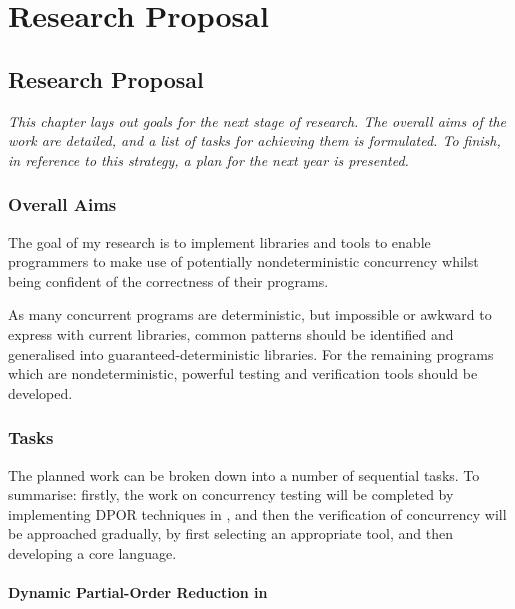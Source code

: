\part{Research Proposal}


\chapter{Research Proposal}
\label{chp:proposal}

\textit{This chapter lays out goals for the next stage of
  research. The overall aims of the work are detailed, and a list of
  tasks for achieving them is formulated. To finish, in reference to
  this strategy, a plan for the next year is presented.}

\section{Overall Aims}
\label{sec:proposal-goals}

The goal of my research is to implement libraries and tools to enable
programmers to make use of potentially nondeterministic concurrency
whilst being confident of the correctness of their programs.

As many concurrent programs are deterministic, but impossible or
awkward to express with current libraries, common patterns should be
identified and generalised into guaranteed-deterministic
libraries. For the remaining programs which are nondeterministic,
powerful testing and verification tools should be developed.

\section{Tasks}
\label{sec:proposal-tasks}

The planned work can be broken down into a number of sequential
tasks. To summarise: firstly, the work on concurrency testing will be
completed by implementing DPOR techniques in \dejafu{}, and then the
verification of concurrency will be approached gradually, by first
selecting an appropriate tool, and then developing a core language.

\subsection*{Dynamic Partial-Order Reduction in \dejafu{}}
\label{sec:proposal-tasks-dpor}

